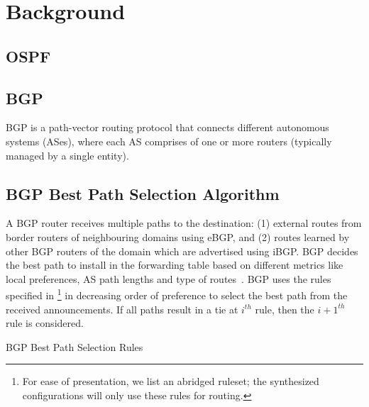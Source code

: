 \section{Background}
\subsection{OSPF}

\subsection{BGP}
BGP is a path-vector routing protocol that connects 
different autonomous systems (ASes), where each AS
comprises of one or more routers (typically managed
by a single entity). 
\\

\subsection{BGP Best Path Selection Algorithm}
A BGP router receives multiple paths to the destination: (1)
external routes from border routers of neighbouring domains using
eBGP, and (2) routes learned by other BGP routers 
of the domain which are advertised using iBGP. 
BGP decides the best path to install in the 
forwarding table based on different metrics like local preferences,
AS path lengths and type of routes~\cite{bgp}. BGP uses the
rules specified in \footnote{
For ease of presentation, we list an abridged ruleset; 
the synthesized configurations will only use these rules 
for routing.  
} 
in decreasing order of preference to select the best path
from the received announcements. If all paths result in a tie
at $i^{th}$ rule, then the $i+1^{th}$ rule is considered.
\begin{algorithm}
	\begin{footnotesize}
		\caption{BGP Best Path Selection Rules}
		\label{alg:bgppathrules}
		\begin{algorithmic}[1]
		\end{algorithmic}
	\end{footnotesize}
\end{algorithm}



